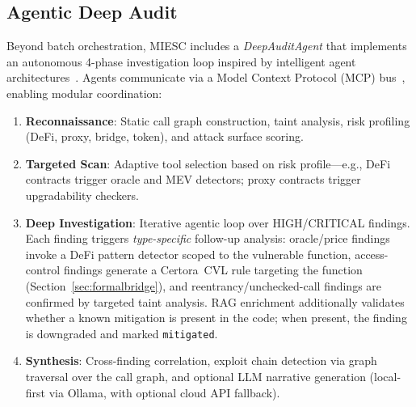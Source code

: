 \documentclass[conference]{IEEEtran}
\begin{document}
\subsection{Agentic Deep Audit}
\label{sec:deepaudit}

Beyond batch orchestration, MIESC includes a \emph{DeepAuditAgent} that implements an autonomous 4-phase investigation loop inspired by intelligent agent architectures~\cite{wooldridge1995intelligent}. Agents communicate via a Model Context Protocol (MCP) bus~\cite{mcp2024}, enabling modular coordination:

\begin{enumerate}
    \item \textbf{Reconnaissance}: Static call graph construction, taint analysis, risk profiling (DeFi, proxy, bridge, token), and attack surface scoring.
    \item \textbf{Targeted Scan}: Adaptive tool selection based on risk profile---e.g., DeFi contracts trigger oracle and MEV detectors; proxy contracts trigger upgradability checkers.
    \item \textbf{Deep Investigation}: Iterative agentic loop over HIGH/CRITICAL findings. Each finding triggers \emph{type-specific} follow-up analysis: oracle/price findings invoke a DeFi pattern detector scoped to the vulnerable function, access-control findings generate a Certora~CVL rule targeting the function (Section~\ref{sec:formalbridge}), and reentrancy/unchecked-call findings are confirmed by targeted taint analysis. RAG enrichment additionally validates whether a known mitigation is present in the code; when present, the finding is downgraded and marked \texttt{mitigated}.
    \item \textbf{Synthesis}: Cross-finding correlation, exploit chain detection via graph traversal over the call graph, and optional LLM narrative generation (local-first via Ollama, with optional cloud API fallback).
\end{enumerate}
\end{document}
